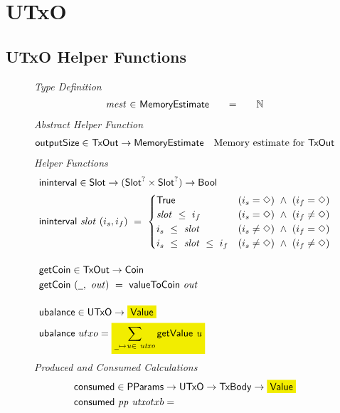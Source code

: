 \section{UTxO}
\label{sec:utxo}

\subsection*{UTxO Helper Functions}

\begin{figure}[htb]
  \emph{Type Definition}
  \begin{equation*}
    \begin{array}{r@{~\in~}l@{\qquad=\qquad}lr}
      \var{mest} & \MemoryEstimate & \N
    \end{array}
  \end{equation*}
  \emph{Abstract Helper Function}
  \begin{align*}
    \mathsf{outputSize} \in& ~\mathsf{TxOut} \to \mathsf{MemoryEstimate} & \text{Memory estimate for}~\mathsf{TxOut}
  \end{align*}
  \emph{Helper Functions}
  \begin{align*}
    & \fun{ininterval} \in \Slot \to (\Slot^? \times \Slot^?) \to \Bool \\
    & \fun{ininterval}~\var{slot}~(i_s, i_f) ~=~
    \begin{cases}
      \True & (i_s = \Nothing)~\wedge~(i_f = \Nothing) \\
      \var{slot}~\leq~i_f & (i_s = \Nothing)~\wedge~(i_f \neq \Nothing)\\
      i_s~\leq~\var{slot} & (i_s \neq \Nothing)~\wedge~(i_f = \Nothing) \\
      i_s~\leq~\var{slot}~\leq~i_f & (i_s \neq \Nothing)~\wedge~(i_f \neq \Nothing)
    \end{cases}
    \nextdef
    & \fun{getCoin} \in \TxOut \to \Coin \\
    & \fun{getCoin}~{(\wcard,~\var{out})} ~=~\fun{valueToCoin}~\var{out}
    \nextdef
    & \fun{ubalance} \in \UTxO \to \hldiff{\Value} \\
    & \fun{ubalance} ~ utxo = \hldiff{\sum_{\wcard\mapsto\var{u}\in~\var{utxo}} \fun{getValue}~\var{u}}
  \end{align*}
  \emph{Produced and Consumed Calculations}
  \begin{align*}
    & \fun{consumed} \in \PParams \to \UTxO \to \TxBody \to \hldiff{\Value} \\
    & \consumed{pp}{utxo}{txb} = \\

\end{align*}
\end{figure}
